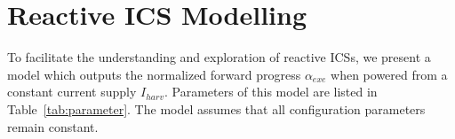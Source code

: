 
\section{Reactive ICS Modelling} \label{section:model}



To facilitate the understanding and exploration of reactive ICSs, we present a model which outputs the normalized forward progress $\alpha_{exe}$ when powered from a constant current supply $I_{harv}$. Parameters of this model are listed in Table~\ref{tab:parameter}. 
The model assumes that all configuration parameters remain constant. 

